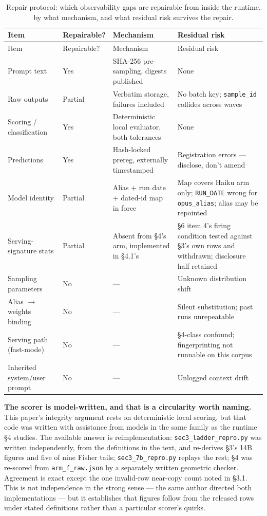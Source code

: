 \begin{longtable}{@{}p{}p{}p{}p{}@{}}
\caption{Repair protocol: which observability gaps are repairable from inside the
runtime, by what mechanism, and what residual risk survives the repair.}\\
\toprule
Item & Repairable? & Mechanism & Residual risk \\
\midrule
\endfirsthead
\toprule
Item & Repairable? & Mechanism & Residual risk \\
\midrule
\endhead
Prompt text & Yes & SHA-256 pre-sampling, digests published & None \\
Raw outputs & Partial & Verbatim storage, failures included & No batch key; \texttt{sample\_id} collides across waves \\
Scoring / classification & Yes & Deterministic local evaluator, both tolerances & None \\
Predictions & Yes & Hash-locked prereg, externally timestamped & Registration errors --- disclose, don't amend \\
Model identity & Partial & Alias + run date + dated-id map in force & Map covers Haiku arm only; \texttt{RUN\_DATE} wrong for \texttt{opus\_alias}; alias may be repointed \\
Serving-signature stats & Partial & Absent from \S4's arm, implemented in \S4.1's & \S6 item 4's firing condition tested against \S3's own rows and withdrawn; disclosure half retained \\
Sampling parameters & No & --- & Unknown distribution shift \\
Alias $\to$ weights binding & No & --- & Silent substitution; past runs unrepeatable \\
Serving path (fast-mode) & No & --- & \S4-class confound; fingerprinting not runnable on this corpus \\
Inherited system/user prompt & No & --- & Unlogged context drift \\
\bottomrule
\end{longtable}

\textbf{The scorer is model-written, and that is a circularity worth naming.} This paper's integrity argument rests on deterministic local scoring, but that code was written with assistance from models in the same family as the runtime \S4 studies. The available answer is reimplementation: \texttt{sec3\_ladder\_repro.py} was written independently, from the definitions in the text, and re-derives \S3's 14B figures and five of nine Fisher tails; \texttt{sec3\_7b\_repro.py} replays the rest; \S4 was re-scored from \texttt{arm\_f\_raw.json} by a separately written geometric checker. Agreement is exact except the one invalid-row near-copy count noted in \S3.1. This is not independence in the strong sense --- the same author directed both implementations --- but it establishes that figures follow from the released rows under stated definitions rather than a particular scorer's quirks.


